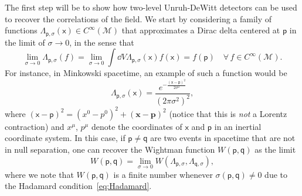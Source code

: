 \documentclass[letterpaper,12pt,titlepage,oneside,final]{book}
\newcommand{\M}{\mathcal{M}}
\newcommand{\mf}{\mathsf}%
\begin{document}
    The first step will be to show how two-level Unruh-DeWitt detectors can be used to recover the correlations of the field. We start by considering a family of functions $\Lambda_{\mf p,\sigma}(\mf x)\in C^\infty(\M)$ that approximates a Dirac delta centered at $\mf p$ in the limit of $\sigma\to 0$, in the sense that
    \begin{equation}
        \lim_{\sigma \to 0}\Lambda_{\mf p, \sigma}(f) = \lim_{\sigma \to 0}\int \dd V \Lambda_{\mf p, \sigma}(\mf x) f(\mf x) = f(\mf p)\quad \forall\,f\in C^\infty(\M).
    \end{equation}
    For instance, in Minkowski spacetime, an example of such a function would be
    \begin{equation}
        \Lambda_{\mf p,\sigma}(\mf x) = \frac{e^{ - \frac{(\mf x - \mf p)^2}{2\sigma^2}}}{(2\pi \sigma^2)^2},
    \end{equation}
    where $(\mf x - \mf p)^2 = (x^0 - p^0)^2 + (\bm x - \bm p)^2$ (notice that this is \textit{not} a Lorentz contraction) and $x^\mu$, $p^\mu$ denote the coordinates of $\mf x$ and $\mf p$ in an inertial coordinate system. In this case, if $\mf p \neq \mf q$ are two events in spacetime that are not in null separation, one can recover the Wightman function $W(\mf p ,\mf q)$ as the limit
    \begin{equation}\label{eq:Wpqlimit}
        W(\mf p, \mf q) = \lim_{\sigma \to 0} W(\Lambda_{\mf p, \sigma},\Lambda_{\mf q, \sigma}),
    \end{equation}
    where we note that $W(\mf p,\mf q)$ is a finite number whenever $\sigma(\mf p,\mf q)\neq 0$ due to the Hadamard condition~\eqref{eq:Hadamard}. 
\end{document}
